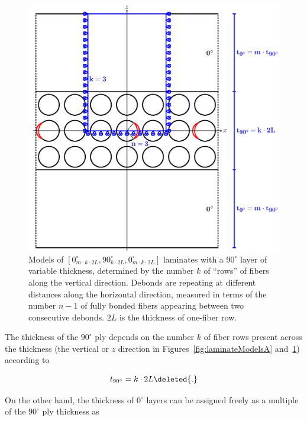 \documentclass[Review,sagev,times]{sagej}
\begin{document}
\begin{figure}[!htb]
\centering
        \includegraphics[height=0.425\textheight]{ThickPly.pdf}
\caption{Models of $\left[0_{m\cdot k\cdot2L}^{\circ},90_{k\cdot2L}^{\circ},0_{m\cdot k\cdot2L}^{\circ}\right]$ laminates with a $90^{\circ}$ layer of variable thickness, determined by the number $k$ of ``rows'' of fibers along the vertical direction.  Debonds are repeating at different distances along the horizontal direction, measured in terms of the number $n-1$ of fully bonded fibers appearing between two consecutive debonds. $2L$ is the thickness of one-fiber row.}\label{fig:laminateModelsB}
\end{figure}

The thickness of the $90^{\circ}$ ply depends on the number $k$ of fiber rows present across the thickness (the vertical or $z$ direction in Figures~\ref{fig:laminateModelsA} and~\ref{fig:laminateModelsB}) according to

\begin{equation}\label{eq:t90}
t_{90^{\circ}}=k\cdot2L\deleted{.}
\end{equation}

On the other hand, the thickness of $0^{\circ}$ layers can be assigned freely as a multiple of the $90^{\circ}$ ply thickness as
\end{document}
